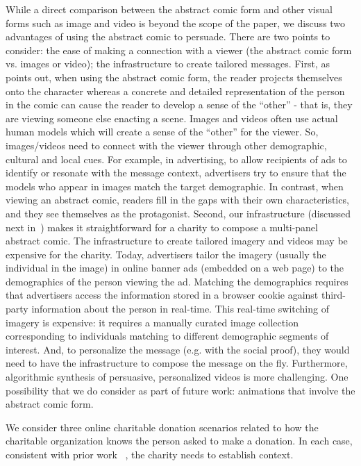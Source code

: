 \begin{description} [leftmargin=\parindent,topsep=0pt,partopsep=3pt,parsep=0pt,itemsep=3pt, listparindent=\parindent]
   \item[Other Media Forms:] While a direct comparison between the abstract comic form and other visual forms such as image and video is beyond the scope of the paper, we discuss two advantages of using the abstract comic to persuade. There are two points to consider: the ease of making a connection with a viewer (the abstract comic form vs. images or video); the infrastructure to create tailored messages. First, as \textcite{mccloud2011making} points out, when using the abstract comic form, the reader projects themselves onto the character whereas a concrete and detailed representation of the person in the comic can cause the reader to develop a sense of the ``other'' - that is, they are viewing someone else enacting a scene. Images and videos often use actual human models which will create a sense of the ``other'' for the viewer. So, images/videos need to connect with the viewer through other demographic, cultural and local cues. For example, in advertising, to allow recipients of ads to identify or resonate with the message context, advertisers try to ensure that the models who appear in images match the target demographic. In contrast, when viewing an abstract comic, readers fill in the gaps with their own characteristics, and they see themselves as the protagonist. Second, our infrastructure (discussed next in~) makes it straightforward for a charity to compose a multi-panel abstract comic. The infrastructure to create tailored imagery and videos may be expensive for the charity. Today, advertisers tailor the imagery (usually the individual in the image) in online banner ads (embedded on a web page) to the demographics of the person viewing the ad. Matching the demographics requires that advertisers access the information stored in a browser cookie against third-party information about the person in real-time. This real-time switching of imagery is expensive: it requires a manually curated image collection corresponding to individuals matching to different demographic segments of interest. And, to personalize the message (e.g. with the social proof), they would need to have the infrastructure to compose the message on the fly. Furthermore, algorithmic synthesis of persuasive, personalized videos is more challenging. One possibility that we do consider as part of future work: animations that involve the abstract comic form.

    \item[Experiment Flow in the Real World:] We consider three online charitable donation scenarios related to how the charitable organization knows the person asked to make a donation. In each case, consistent with prior work ~\cite{pessemier1977willingness}, the charity needs to establish context.
    

\end{description}
